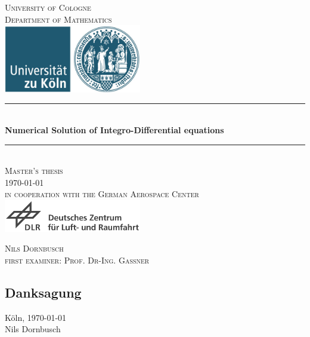 \documentclass[12pt,a4paper,twoside, open=right]{scrreprt}
\theoremstyle{definition}
\theoremstyle{plain}
\begin{document}
\begin{titlepage}
\pagestyle{empty}
\begin{center}
\newcommand{\HRule}{\rule{\linewidth}{0.7mm}}
\textsc{\LARGE University of Cologne }\\ [0.4cm]
\textsc{ Department of Mathematics} \\[1.5cm]
\includegraphics[width=0.45\textwidth]{uni}\\[1.5cm]  %
\HRule \\[0.4cm]
{ \huge \bfseries Numerical Solution of Integro-Differential equations}\\[0.4cm]
\HRule \\[1cm]
\textsc{\Large Master's thesis}\\[2mm]
\textsc{\today}\\[10mm]
\textsc{in cooperation with the German Aerospace Center}\\[1.0cm]
\includegraphics[width=0.45\textwidth]{DLR-Logo-full}\\[1.0cm]


  




\begin{center}

\textsc{\Large Nils Dornbusch} \\[3pt]
\textsc{\Large first examiner: Prof. Dr-Ing. Gassner}
\end{center}
\end{center}
\end{titlepage}
\begin{otherlanguage}{ngerman}
  

\chapter*{Danksagung}
\lipsum[1]
Köln, \today 
\\[1cm]
Nils Dornbusch
\end{otherlanguage}
\newpage
\tableofcontents
\newpage
\end{document}

